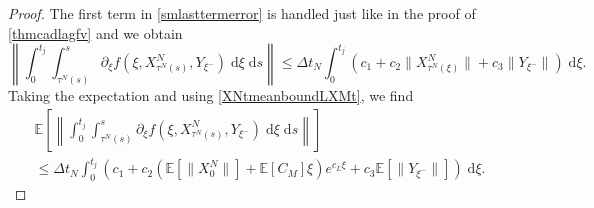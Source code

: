 \documentclass[reqno,12pt]{amsart}
\theoremstyle{plain} %
\theoremstyle{definition} %
\begin{document}
\begin{proof}
    The first term in \eqref{smlasttermerror} is handled just like in the proof of \cref{thmcadlagfv} and we obtain
    \[
        \left\|\int_0^{t_j} \int_{\tau^N(s)}^s \partial_\xi f(\xi, X_{\tau^N(s)}^N, Y_{\xi^-})\;\mathrm{d}\xi\;\mathrm{d}s\right\| \leq \Delta t_N\int_0^{t_j} \left(c_1 + c_2 \|X_{\tau^N(\xi)}^N\| + c_3\|Y_{\xi^-}\|\right)\;\mathrm{d}\xi.
    \]
    Taking the expectation and using \eqref{XNtmeanboundLXMt}, we find
    \begin{multline*}
        \mathbb{E}\left[\left\|\int_0^{t_j} \int_{\tau^N(s)}^s \partial_\xi f(\xi, X_{\tau^N(s)}^N, Y_{\xi^-})\;\mathrm{d}\xi\;\mathrm{d}s\right\|\right] \\
        \leq \Delta t_N\int_0^{t_j} \left(c_1 + c_2  \left(\mathbb{E}\left[\|X_0^N\|\right] + \mathbb{E}[C_M] \xi \right)e^{c_L \xi} + c_3\mathbb{E}\left[\|Y_{\xi^-}\|\right]\right)\;\mathrm{d}\xi.
    \end{multline*}


\end{proof}
\end{document}
